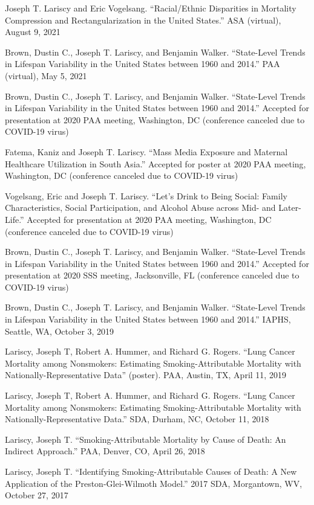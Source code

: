 \documentclass[11pt,]{article}
\begin{document}
Joseph T. Lariscy and Eric Vogelsang. ``Racial/Ethnic Disparities in
Mortality Compression and Rectangularization in the United States.'' ASA
(virtual), August 9, 2021

Brown, Dustin C., Joseph T. Lariscy, and Benjamin Walker. ``State-Level
Trends in Lifespan Variability in the United States between 1960 and
2014.'' PAA (virtual), May 5, 2021

Brown, Dustin C., Joseph T. Lariscy, and Benjamin Walker. ``State-Level
Trends in Lifespan Variability in the United States between 1960 and
2014.'' Accepted for presentation at 2020 PAA meeting, Washington, DC
(conference canceled due to COVID-19 virus)

Fatema, Kaniz and Joseph T. Lariscy. ``Mass Media Exposure and Maternal
Healthcare Utilization in South Asia.'' Accepted for poster at 2020 PAA
meeting, Washington, DC (conference canceled due to COVID-19 virus)

Vogelsang, Eric and Joseph T. Lariscy. ``Let's Drink to Being Social:
Family Characteristics, Social Participation, and Alcohol Abuse across
Mid- and Later-Life.'' Accepted for presentation at 2020 PAA meeting,
Washington, DC (conference canceled due to COVID-19 virus)

Brown, Dustin C., Joseph T. Lariscy, and Benjamin Walker. ``State-Level
Trends in Lifespan Variability in the United States between 1960 and
2014.'' Accepted for presentation at 2020 SSS meeting, Jacksonville, FL
(conference canceled due to COVID-19 virus)

Brown, Dustin C., Joseph T. Lariscy, and Benjamin Walker. ``State-Level
Trends in Lifespan Variability in the United States between 1960 and
2014.'' IAPHS, Seattle, WA, October 3, 2019

Lariscy, Joseph T, Robert A. Hummer, and Richard G. Rogers. ``Lung
Cancer Mortality among Nonsmokers: Estimating Smoking-Attributable
Mortality with Nationally-Representative Data'' (poster). PAA, Austin,
TX, April 11, 2019

Lariscy, Joseph T, Robert A. Hummer, and Richard G. Rogers. ``Lung
Cancer Mortality among Nonsmokers: Estimating Smoking-Attributable
Mortality with Nationally-Representative Data.'' SDA, Durham, NC,
October 11, 2018

Lariscy, Joseph T. ``Smoking-Attributable Mortality by Cause of Death:
An Indirect Approach.'' PAA, Denver, CO, April 26, 2018

Lariscy, Joseph T. ``Identifying Smoking-Attributable Causes of Death: A
New Application of the Preston-Glei-Wilmoth Model.'' 2017 SDA,
Morgantown, WV, October 27, 2017
\end{document}
